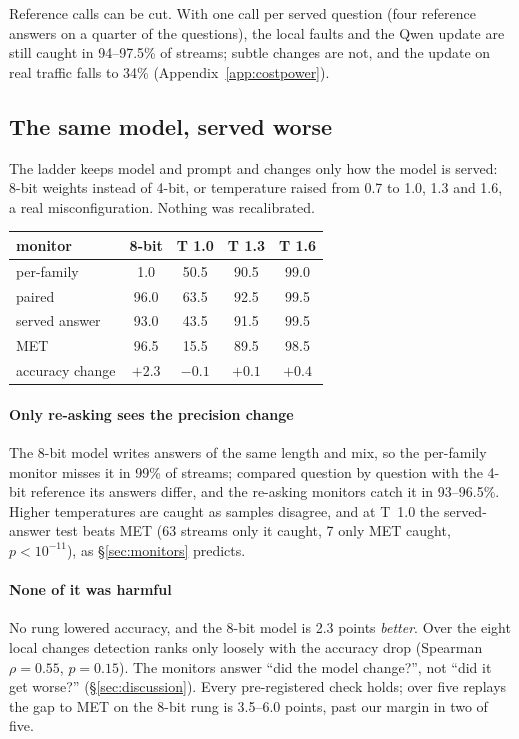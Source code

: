 \documentclass{article}
\begin{document}
Reference calls can be cut. With one call per served question (four reference
answers on a quarter of the questions), the local faults and the Qwen update are
still caught in 94--97.5\% of streams; subtle changes are not, and the update on real
traffic falls to 34\% (Appendix~\ref{app:costpower}).

\subsection{The same model, served worse}
\label{sec:ladder}

The ladder keeps model and prompt and changes only how the model is served: 8-bit
weights instead of 4-bit, or temperature raised from 0.7 to 1.0, 1.3 and 1.6, a real
misconfiguration. Nothing was recalibrated.

\begin{center}\small
\setlength{\tabcolsep}{4pt}
\begin{tabular}{lcccc}
  \toprule
  monitor & 8-bit & T 1.0 & T 1.3 & T 1.6 \\
  \midrule
  per-family & 1.0 & 50.5 & 90.5 & 99.0 \\
  paired & 96.0 & 63.5 & 92.5 & 99.5 \\
  served answer & 93.0 & 43.5 & 91.5 & 99.5 \\
  MET & 96.5 & 15.5 & 89.5 & 98.5 \\
  \midrule
  accuracy change & $+2.3$ & $-0.1$ & $+0.1$ & $+0.4$ \\
  \bottomrule
\end{tabular}
\end{center}

\paragraph{Only re-asking sees the precision change} The 8-bit model writes answers
of the same length and mix, so the per-family monitor misses it in 99\% of streams;
compared question by question with the 4-bit reference its answers differ, and the
re-asking monitors catch it in 93--96.5\%. Higher temperatures are caught as samples
disagree, and at T~1.0 the served-answer test beats MET (63 streams only it caught,
7 only MET caught, $p<10^{-11}$), as \S\ref{sec:monitors} predicts.

\paragraph{None of it was harmful} No rung lowered accuracy, and the 8-bit model is
2.3 points \emph{better}. Over the eight local changes detection ranks only loosely
with the accuracy drop (Spearman $\rho=0.55$, $p=0.15$). The monitors answer ``did
the model change?'', not ``did it get worse?'' (\S\ref{sec:discussion}). Every
pre-registered check holds; over five replays the gap to MET on the 8-bit rung is
3.5--6.0 points, past our margin in two of five.
\end{document}
